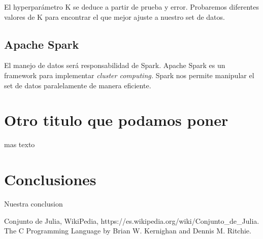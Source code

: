 \documentclass[a4paper,10pt]{article}
\begin{document}
	El hyperparámetro K se deduce a partir de prueba y error. Probaremos diferentes valores de K para encontrar el que mejor ajuste a nuestro set de datos.
	
	\subsection{Apache Spark}
	El manejo de datos será responsabilidad de Spark. Apache Spark es un framework para implementar \textit{cluster computing.} Spark nos permite manipular el set de datos paralelamente de manera eficiente. 
	
	
	\section{Otro titulo que podamos poner}
	
	mas texto
	
	\section{Conclusiones}
	
	Nuestra conclusion
	
	\begin{thebibliography}{99}
		
		 Conjunto de Julia, WikiPedia, https://es.wikipedia.org/wiki/Conjunto\_de\_Julia.
		 The C Programming Language by Brian W. Kernighan and Dennis M. Ritchie.
		
	\end{thebibliography}
	
\end{document}

